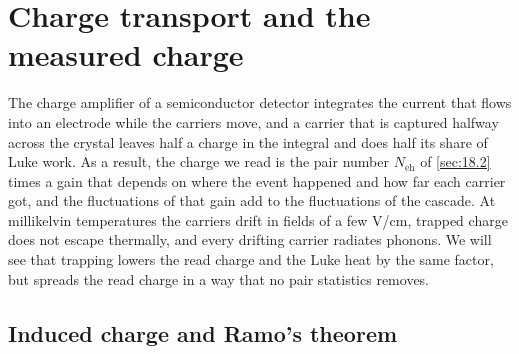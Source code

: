 \section{Charge transport and the measured charge}\label{sec:20.1}

The charge amplifier of a semiconductor detector integrates the current that flows into an electrode while the carriers move, and a carrier that is captured halfway across the crystal leaves half a charge in the integral and does half its share of Luke work. As a result, the charge we read is the pair number $N_{\mathrm{eh}}$ of \cref{sec:18.2} times a gain that depends on where the event happened and how far each carrier got, and the fluctuations of that gain add to the fluctuations of the cascade. At millikelvin temperatures the carriers drift in fields of a few V/cm, trapped charge does not escape thermally, and every drifting carrier radiates phonons. We will see that trapping lowers the read charge and the Luke heat by the same factor, but spreads the read charge in a way that no pair statistics removes.

\subsection{Induced charge and Ramo's theorem}\label{sec:20.1-ramo}

